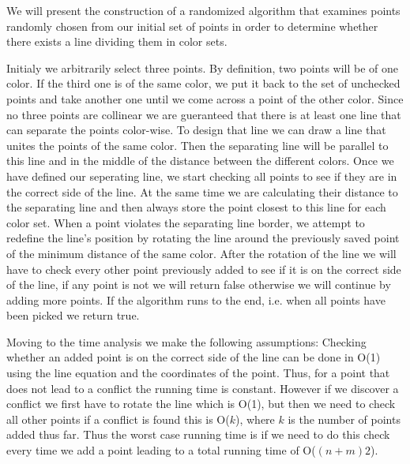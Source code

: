 We will present the construction of a randomized algorithm that examines points randomly chosen from our initial set of points in order to determine whether there exists a line dividing them in color sets. 

Initialy we arbitrarily select three points. By definition, two points will be of one color. If the third one is of the same color, we put it back to the set of unchecked points and take another one until we come across a point of the other color. Since no three points are collinear we are gueranteed that there is at least one line that can separate the points color-wise. To design that line we can draw a line that unites the points of the same color. Then the separating line will be parallel to this line and in the middle of the distance between the different colors. Once we have defined our seperating line, we start checking all points to see if they are in the correct side of the line. At the same time we are calculating their distance to the separating line and then always store the point closest to this line for each color set. When a point violates the separating line border, we attempt to redefine the line's position by rotating the line around the previously saved point of the minimum distance of the same color. After the rotation of the line we will have to check every other point previously added to see if it is on the correct side of the line, if any point is not we will return false otherwise we will continue by adding more points. If the algorithm runs to the end, i.e. when all points have been picked we return true.

Moving to the time analysis we make the following assumptions: Checking whether an added point is on the correct side of the line can be done in O(1) using the line equation and the coordinates of the point. Thus, for a point that does not lead to a conflict the running time is constant. However if we discover a conflict we first have to rotate the line which is O(1), but then we need to check all other points if a conflict is found this is O($k$), where $k$ is the number of points added thus far. Thus the worst case running time is if we need to do this check every time we add a point leading to a total running time of O($(n + m)2$). 

